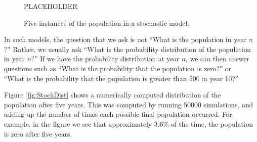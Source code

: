 \begin{figure}
\centerline{%
PLACEHOLDER
}
\caption{Five instances of the population in 
a stochastic model.}
\label{fig:StochModel}
\end{figure}

In such models, the question that we ask is not
``What is the population in year $n$?''
Rather, we usually ask ``What is the probability
distribution of the population in year $n$?''
If we have the probability distribution at year
$n$, we can then answer questions such as
``What is the probability that the population is zero?''
or ``What is the probability that the population is
greater than 500 in year 10?''

Figure \ref{fig:StochDist} shows a numerically
computed distribution of the population after
five years. This was computed by running 50000
simulations, and adding up the number of times
each possible final population occurred.
For example, in the figure we see that
approximately 3.6\% of the time, the population
is zero after five years.

